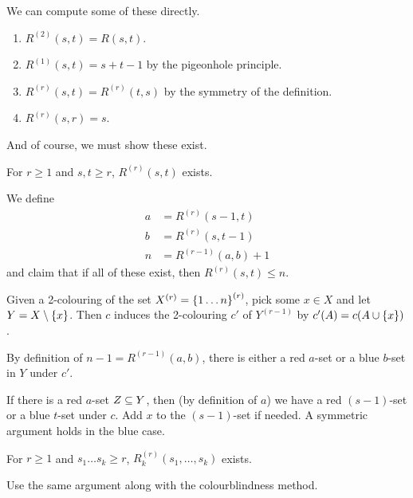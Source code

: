 \documentclass{article}
\begin{document}
\begin{example}
	We can compute some of these directly.
    \begin{enumerate}
	    \item $R^{(2)}(s, t) = R(s, t)$.
	    \item $R^{(1)}(s, t) = s + t - 1$ by the pigeonhole principle.
	    \item $R^{(r)}(s, t) = R^{(r)}(t, s)$ by the symmetry of the definition.
	    \item $R^{(r)}(s, r) = s$.
	\end{enumerate}
\end{example}

And of course, we must show these exist.

\begin{theorem}
    For $r \geq 1$ and $s, t \geq r$, $R^{(r)}(s, t)$ exists.
\end{theorem}

\begin{prf}
    We define
    \begin{align*}
    	a &= R^{(r)}(s-1, t) \\
    	b &= R^{(r)}(s, t-1) \\
    	n &= R^{(r-1)}(a,b) + 1
	\end{align*}
	and claim that if all of these exist, then $R^{(r)}(s, t) \leq n$.
    
    Given a 2-colouring of the set $X^{(r)} = \left\lbrace 1\dots n \right\rbrace^{(r)}$, pick some $x \in X$ and let $Y = X \setminus \left\lbrace x \right\rbrace$. Then $c$ induces the 2-colouring $c'$ of $Y^{(r-1)}$ by $c'(A) = c(A \cup \left\lbrace x \right\rbrace )$.
    
    By definition of $n - 1 = R^{(r-1)}(a, b)$, there is either a red $a$-set or a blue $b$-set in $Y$ under $c'$.
    
    If there is a red $a$-set $Z \subseteq Y$, then (by definition of $a$) we have a red $(s-1)$-set or a blue $t$-set under $c$. Add $x$ to the $(s-1)$-set if needed. A symmetric argument holds in the blue case.
\end{prf}

\begin{corollary}
    For $r \geq 1$ and $s_1 \dots s_k \geq r$, $R^{(r)}_k (s_1, \dots, s_k)$ exists.
\end{corollary}

\begin{prf}
    Use the same argument along with the colourblindness method.
\end{prf} 
\end{document}
